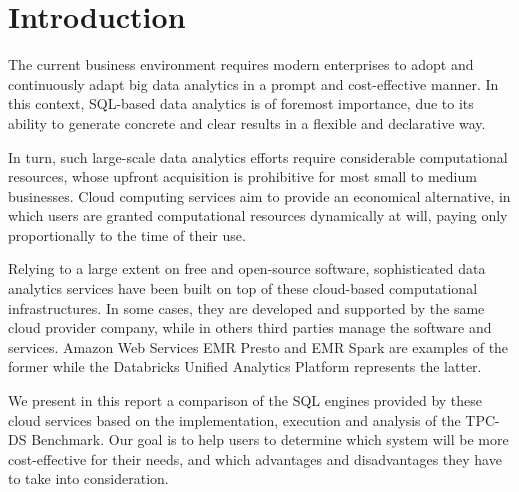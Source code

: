 \section{Introduction}\label{introduction}

The current business environment requires modern enterprises to adopt and continuously adapt big data analytics in a prompt and cost-effective manner. In this context, SQL-based data analytics is of foremost importance, due to its ability to generate concrete and clear results in a flexible and declarative way.

In turn, such large-scale data analytics efforts require considerable computational resources, whose upfront acquisition is prohibitive for most small to medium businesses. Cloud computing services aim to provide an economical alternative, in which users are granted computational resources dynamically at will, paying only proportionally to the time of their use.

Relying to a large extent on free and open-source software, sophisticated data analytics services have been built on top of these cloud-based computational infrastructures. In some cases, they are developed and supported by the same cloud provider company, while in others third parties manage the software and services. Amazon Web Services EMR Presto and EMR Spark are examples of the former while the Databricks Unified Analytics Platform represents the latter.

We present in this report a comparison of the SQL engines provided by these cloud services based on the implementation, execution and analysis of the TPC-DS Benchmark. Our goal is to help users to determine which system will be more cost-effective for their needs, and which advantages and disadvantages they have to take into consideration.




